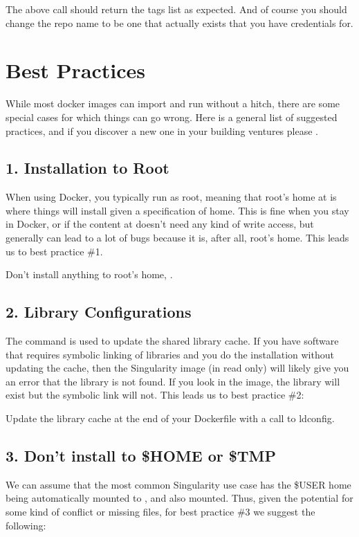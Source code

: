\documentclass[letterpaper,10pt,english]{sphinxmanual}
\begin{document}
The above call should return the tags list as expected. And of course
you should change the repo name to be one that actually exists that you
have credentials for.


\section{Best Practices}
\label{\detokenize{singularity_and_docker:best-practices}}
While most docker images can import and run without a hitch, there are
some special cases for which things can go wrong. Here is a general list
of suggested practices, and if you discover a new one in your building
ventures please .


\subsection{1. Installation to Root}
\label{\detokenize{singularity_and_docker:installation-to-root}}
When using Docker, you typically run as root, meaning that root’s home
at  is where things will install given a specification of home. This is
fine when you stay in Docker, or if the content at  doesn’t need any
kind of write access, but generally can lead to a lot of bugs because
it is, after all, root’s home. This leads us to best practice \#1.

Don’t install anything to root’s home, .


\subsection{2. Library Configurations}
\label{\detokenize{singularity_and_docker:library-configurations}}
The command  is used to update the shared library cache. If
you have software that requires symbolic linking of libraries and you
do the installation without updating the cache, then the Singularity
image (in read only) will likely give you an error that the library is
not found. If you look in the image, the library will exist but the
symbolic link will not. This leads us to best practice \#2:

Update the library cache at the end of your Dockerfile with a call
to ldconfig.


\subsection{3. Don’t install to \$HOME or \$TMP}
\label{\detokenize{singularity_and_docker:don-t-install-to-home-or-tmp}}
We can assume that the most common Singularity use case has the \$USER
home being automatically mounted to , and  also mounted. Thus, given
the potential for some kind of conflict or missing files, for best
practice \#3 we suggest the following:
\end{document}
